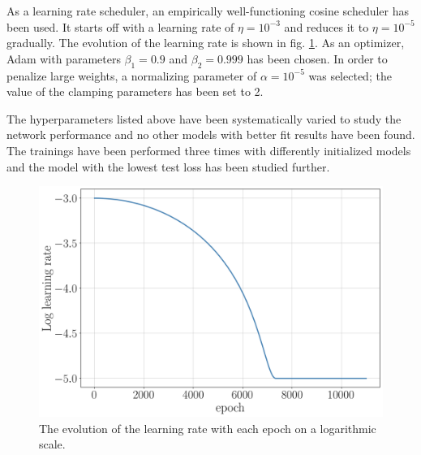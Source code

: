 As a learning rate scheduler, an empirically well-functioning cosine scheduler has been used. It starts off with a learning rate of $\eta = 10^{-3}$ and reduces it to $\eta = 10^{-5}$ gradually. The evolution of the learning rate is shown in fig. \ref{fig:lr}. As an optimizer, Adam with parameters $\beta_1 = 0.9$ and $\beta_2 = 0.999$ has been chosen. In order to penalize large weights, a normalizing parameter of $\alpha = 10^{-5}$ was selected; the value of the clamping parameters has been set to 2.

The hyperparameters listed above have been systematically varied to study the network performance and no other models with better fit results have been found. The trainings have been performed three times with differently initialized models and the model with the lowest test loss has been studied further. 

\begin{figure}[h!]
	\centering
	\includegraphics[width=0.6\linewidth]{figures/network_setup/lr}
	\caption{The evolution of the learning rate with each epoch on a logarithmic scale.}
	\label{fig:lr}
\end{figure}